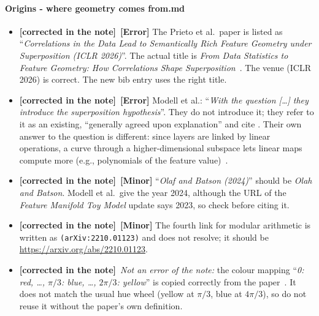 \documentclass[11pt,a4paper]{article}
\newcommand{\note}[1]{\textsf{#1}}                 %
\newcommand{\sev}[1]{\textbf{[#1]}}                 %
\newcommand{\claim}[1]{\enquote{\textit{#1}}}       %
\newcommand{\fixed}{\textbf{\textcolor{green!50!black}{[corrected in the note]}}} %
\begin{document}
\paragraph{\note{Origins - where geometry comes from.md}}
\begin{itemize}
  \item \fixed\ \sev{Error} The Prieto et al.\ paper is listed as
    \claim{Correlations in the Data Lead to Semantically Rich Feature
    Geometry under Superposition (ICLR 2026)}. The actual title is
    \emph{From Data Statistics to Feature Geometry: How Correlations Shape
    Superposition}~\cite{prieto2026correlations}. The venue (ICLR 2026) is
    correct. The new bib entry uses the right title.
  \item \fixed\ \sev{Error} Modell et al.: \claim{With the question [\dots] they
    introduce the superposition hypothesis}. They do not introduce it; they
    refer to it as an existing, \enquote{generally agreed upon explanation}
    and cite \textcite{elhage2022toy}. Their own answer to the question is
    different: since layers are linked by linear operations, a curve through
    a higher-dimensional subspace lets linear maps compute more (e.g.,
    polynomials of the feature value)~\cite{modell2025origins}.
  \item \fixed\ \sev{Minor} \claim{Olaf and Batson (2024)} should be \emph{Olah and
    Batson}. Modell et al.\ give the year 2024, although the URL of the
    \emph{Feature Manifold Toy Model} update says 2023, so check before
    citing it.
  \item \fixed\ \sev{Minor} The fourth link for modular arithmetic is
    written as \texttt{(arXiv:2210.01123)} and does not resolve; it should be
    \url{https://arxiv.org/abs/2210.01123}.
  \item \fixed\ \textit{Not an error of the note:} the colour mapping \claim{0: red,
    \dots, $\pi/3$: blue, \dots, $2\pi/3$: yellow} is copied correctly from
    the paper~\cite{modell2025origins}. It does not match the usual hue
    wheel (yellow at $\pi/3$, blue at $4\pi/3$), so do not reuse it without
    the paper's own definition.
\end{itemize}
\end{document}
